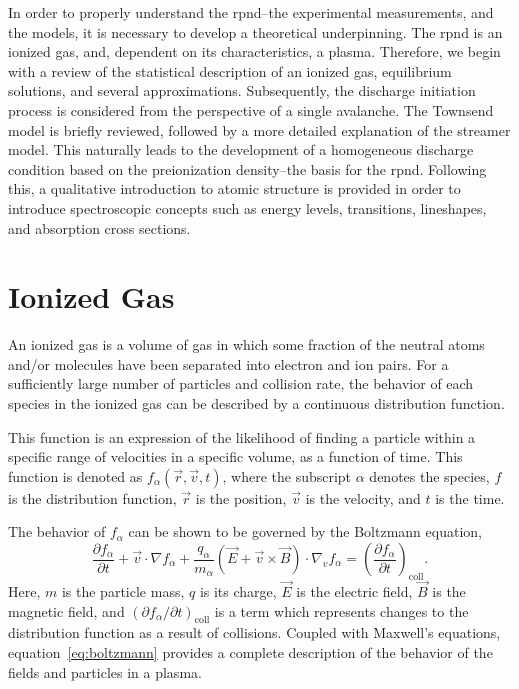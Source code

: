 In order to properly understand the \acs{rpnd}--the experimental measurements,
and the models, it is necessary to develop a theoretical underpinning. The
\acs{rpnd} is an ionized gas, and, dependent on its characteristics, a plasma.
Therefore, we begin with a review of the statistical description of an ionized
gas, equilibrium solutions, and several approximations. Subsequently, the
discharge initiation process is considered from the perspective of a single
avalanche. The Townsend model is briefly reviewed, followed by a more detailed
explanation of the streamer model. This naturally leads to the development of a
homogeneous discharge condition based on the preionization density--the basis
for the \acs{rpnd}. Following this, a qualitative introduction to atomic
structure is provided in order to introduce spectroscopic concepts such as
energy levels, transitions, lineshapes, and absorption cross sections.

\section{Ionized Gas}
An ionized gas is a volume of gas in which some fraction of the neutral atoms
and/or molecules have been separated into electron and ion pairs. For a
sufficiently large number of particles and collision rate, the behavior of each
species in the ionized gas can be described by a continuous distribution
function.

This function is an expression of the likelihood of finding a particle within a
specific range of velocities in a specific volume, as a function of time. This
function is denoted as $f_\alpha(\vec{r}, \vec{v}, t)$, where the subscript
$\alpha$ denotes the species, $f$ is the distribution function, $\vec{r}$ is the
position, $\vec{v}$ is the velocity, and $t$ is the time.

The behavior of $f_\alpha$ can be shown \cite{Bellan2008} to be governed by the
Boltzmann equation,
\begin{equation}\label{eq:boltzmann}
  \frac{\partial f_\alpha}{\partial t} + \vec{v}\cdot\nabla f_\alpha +
  \frac{q_\alpha}{m_\alpha} \left(\vec{E} + \vec{v}\times\vec{B}\right)
  \cdot \nabla_v f_\alpha = \left( \frac{\partial f_\alpha}
  {\partial t}\right)_\mathrm{coll}.
\end{equation}
Here, $m$ is the particle mass, $q$ is its charge, $\vec{E}$ is the electric
field, $\vec{B}$ is the magnetic field, and $(\partial f_\alpha/\partial
t)_\mathrm{coll}$ is a term which represents changes to the distribution
function as a result of collisions. Coupled with Maxwell's equations,
equation~\ref{eq:boltzmann} provides a complete description of the behavior of
the fields and particles in a plasma.

